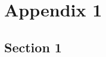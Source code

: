 \chapter{Appendix 1}
\label{ch:appendix1}


\clearpage

\section{Section 1}
\label{sec:appendixsection1}


\cleardoublepage